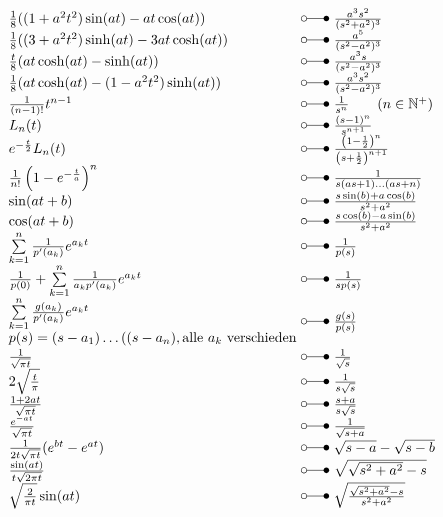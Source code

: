 \begin{footnotesize}
\[ \begin{array}{@{}l@{ ~ \laplace ~ }l@{}}
\frac{1}{8} ((1 + a^2 t^2) \sin(at) - at \cos(at)) &
    \frac{a^3 s^2}{(s^2 + a^2)^3} \\
\frac{1}{8} ((3 + a^2 t^2) \sinh(at) - 3 at \cosh(at)) &
    \frac{a^5}{(s^2 - a^2)^3} \\
\frac{t}{8} (at \cosh(at) - \sinh(at)) &
    \frac{a^3 s}{(s^2 - a^2)^3} \\
\frac{1}{8} (at \cosh(at) - (1 - a^2 t^2) \sinh(at)) &
    \frac{a^3 s^2}{(s^2 - a^2)^3} \\
\frac{1}{(n - 1)!} t^{n - 1} &
    \frac{1}{s^n} \qquad (n \in \mathbb{N^+}) \\
L_n(t) &
    \frac{(s - 1)^n}{s^{n + 1}} \\
e^{-\frac{t}{2}} L_n(t) &
    \frac{\left(1 - \frac{1}{2}\right)^n}{\left(s + \frac{1}{2}\right)^{n + 1}} \\
\frac{1}{n!} \left(1 - e^{-\frac{t}{a}}\right)^n &
    \frac{1}{s (as + 1) \ldots (as + n)} \\
\sin(at + b) &
    \frac{s \sin(b) + a \cos(b)}{s^2 + a^2} \\
\cos(at + b) &
    \frac{s \cos(b) - a \sin(b)}{s^2 + a^2} \\
\sum\limits_{k=1}^{n} \frac{1}{p'(a_k)} e^{a_k t} &
    \frac{1}{p(s)} \\
\frac{1}{p(0)} + \sum\limits_{k=1}^{n} \frac{1}{a_k p'(a_k)} e^{a_k t} &
    \frac{1}{s p(s)} \\
\begin{array}{@{}l@{}}
\sum\limits_{k=1}^{n} \frac{g(a_k)}{p'(a_k)} e^{a_k t} \\
p(s) = (s - a_1) \ldots ((s - a_n), \text{alle } a_k \text{ verschieden} \\
\end{array} &
    \frac{g(s)}{p(s)} \\
\frac{1}{\sqrt{\pi t}} &
    \frac{1}{\sqrt{s}} \\
2 \sqrt{\frac{t}{\pi}} &
    \frac{1}{s \sqrt{s}} \\
\frac{1 + 2 at}{\sqrt{\pi t}} &
    \frac{s + a}{s \sqrt{s}} \\
\frac{e^{-at}}{\sqrt{\pi t}} &
    \frac{1}{\sqrt{s + a}} \\
\frac{1}{2 t \sqrt{\pi t}} (e^{bt} - e^{at}) &
    \sqrt{s - a} - \sqrt{s - b} \\
\frac{\sin(at)}{t \sqrt{2 \pi t}} &
    \sqrt{\sqrt{s^2 + a^2} - s} \\
\sqrt{\frac{2}{\pi t}} \sin(at) &
    \sqrt{\frac{\sqrt{s^2 + a^2} - s}{s^2 + a^2}} \\
\end{array} \]


\end{footnotesize}
